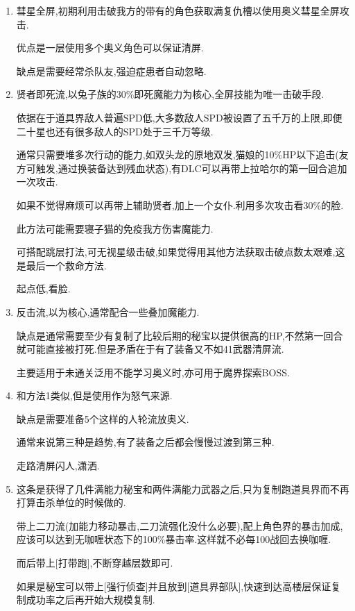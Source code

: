 	\begin{enumerate}

		\item
		彗星全屏,初期利用击破我方的带有{\color{red}{自我牺牲}}的角色获取满复仇槽以使用奥义彗星全屏攻击.

		优点是一层使用多个奥义角色可以保证清屏.
		
		缺点是需要经常杀队友,强迫症患者自动忽略.

		\item
		贤者即死流,以兔子族的30\%即死魔能力为核心,全屏技能为唯一击破手段.

		依据在于道具界敌人普遍SPD低,大多数敌人SPD被设置了五千万的上限,即便二十星也还有很多敌人的SPD处于三千万等级.

		通常只需要堆多次行动的能力,如双头龙的原地双发,猫娘的10\%HP以下追击(友方可触发,通过换装备达到残血状态),有DLC可以再带上拉哈尔的第一回合追加一次攻击.

		如果不觉得麻烦可以再带上辅助贤者,加上一个女仆.利用多次攻击看30\%的脸.

		此方法可能需要寝子猫的免疫我方伤害魔能力.

		可搭配跳层打法,可无视星级击破,如果觉得用其他方法获取击破点数太艰难,这是最后一个救命方法.

		起点低,看脸.

		\item
		反击流,以{\color{red}{强制反击+防御必定反击}}为核心,通常配合一些叠加魔能力.

		缺点是通常需要至少有复制了比较后期的秘宝以提供很高的HP,不然第一回合就可能直接被打死.但是矛盾在于有了装备又不如41武器清屏流.

		主要适用于未通关泛用不能学习奥义时,亦可用于魔界探索BOSS.

		\item
		和方法1类似,但是使用{\color{red}{41号武器}}作为怒气来源.

		缺点是需要准备5个这样的人轮流放奥义.

		通常来说第三种是趋势,有了装备之后都会慢慢过渡到第三种.

		走路清屏闪人,潇洒.

		\item
		这条是获得了几件满能力秘宝和两件满能力武器之后,只为复制跑道具界而不再打算击杀单位的时候做的.

		带上二刀流(加能力移动暴击,二刀流强化没什么必要),配上角色界的暴击加成,应该可以达到无咖喱状态下的100\%暴击率.这样就不必每100战回去换咖喱.

		而后带上[打带跑],不断穿越层数即可.

		如果是秘宝可以带上[强行侦查]并且放到[道具界部队],快速到达高楼层保证复制成功率之后再开始大规模复制.

	\end{enumerate}

